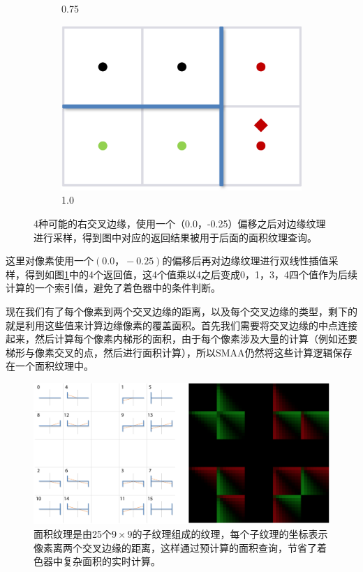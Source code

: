 \begin{figure}
\begin{subfigure}[b]{0.24\textwidth}
		\caption{0.75}
	\end{subfigure}
	\begin{subfigure}[b]{0.24\textwidth}
		\includegraphics[width=1.\textwidth]{figures/shade/crossing-edges-4}
		\caption{1.0}
	\end{subfigure}
\caption{4种可能的右交叉边缘，使用一个（0.0，-0.25）偏移之后对边缘纹理进行采样，得到图中对应的返回结果被用于后面的面积纹理查询。}
\label{f:shade-crossing-edges}
\end{figure}

这里对像素使用一个$(0.0，-0.25)$的偏移后再对边缘纹理进行双线性插值采样，得到如图\ref{f:shade-crossing-edges}中的4个返回值，这4个值乘以4之后变成0，1，3，4四个值作为后续计算的一个索引值，避免了着色器中的条件判断。

现在我们有了每个像素到两个交叉边缘的距离，以及每个交叉边缘的类型，剩下的就是利用这些值来计算边缘像素的覆盖面积。首先我们需要将交叉边缘的中点连接起来，然后计算每个像素内梯形的面积，由于每个像素涉及大量的计算（例如还要梯形与像素交叉的点，然后进行面积计算），所以SMAA仍然将这些计算逻辑保存在一个面积纹理中。

\begin{figure}
\begin{fullwidth}
	\includegraphics[width=\thewidth]{figures/shade/edge}
	\caption{面积纹理是由25个$9\times 9$的子纹理组成的纹理，每个子纹理的坐标表示像素离两个交叉边缘的距离，这样通过预计算的面积查询，节省了着色器中复杂面积的实时计算。}
	\label{f:shade-edge}
\end{fullwidth}
\end{figure}


